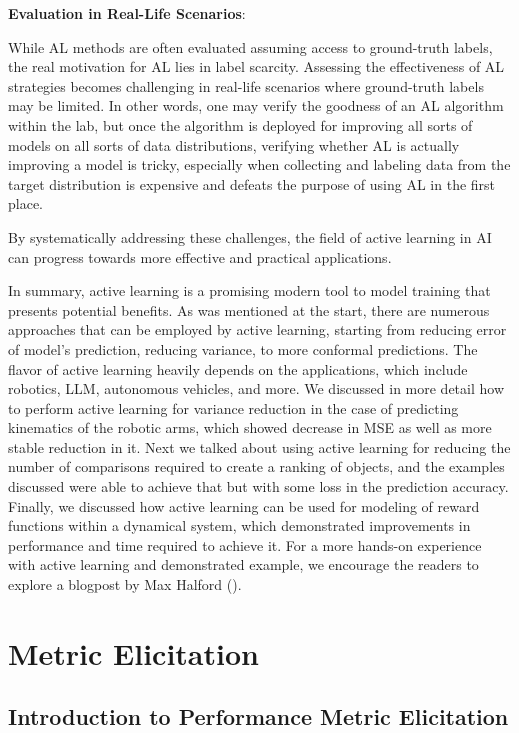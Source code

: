 \documentclass[
  letterpaper,
  numbers=noenddot,
  DIV=11]{scrreprt}
\theoremstyle{definition}
\theoremstyle{plain}
\theoremstyle{plain}
\theoremstyle{remark}
\begin{document}
\textbf{Evaluation in Real-Life Scenarios}:

While AL methods are often evaluated assuming access to ground-truth
labels, the real motivation for AL lies in label scarcity. Assessing the
effectiveness of AL strategies becomes challenging in real-life
scenarios where ground-truth labels may be limited. In other words, one
may verify the goodness of an AL algorithm within the lab, but once the
algorithm is deployed for improving all sorts of models on all sorts of
data distributions, verifying whether AL is actually improving a model
is tricky, especially when collecting and labeling data from the target
distribution is expensive and defeats the purpose of using AL in the
first place.

By systematically addressing these challenges, the field of active
learning in AI can progress towards more effective and practical
applications.

In summary, active learning is a promising modern tool to model training
that presents potential benefits. As was mentioned at the start, there
are numerous approaches that can be employed by active learning,
starting from reducing error of model's prediction, reducing variance,
to more conformal predictions. The flavor of active learning heavily
depends on the applications, which include robotics, LLM, autonomous
vehicles, and more. We discussed in more detail how to perform active
learning for variance reduction in the case of predicting kinematics of
the robotic arms, which showed decrease in MSE as well as more stable
reduction in it. Next we talked about using active learning for reducing
the number of comparisons required to create a ranking of objects, and
the examples discussed were able to achieve that but with some loss in
the prediction accuracy. Finally, we discussed how active learning can
be used for modeling of reward functions within a dynamical system,
which demonstrated improvements in performance and time required to
achieve it. For a more hands-on experience with active learning and
demonstrated example, we encourage the readers to explore a blogpost by
Max Halford ().

\section{Metric Elicitation}\label{sec-metric-elicitation}

\subsection{Introduction to Performance Metric
Elicitation}\label{introduction-to-performance-metric-elicitation}
\end{document}
